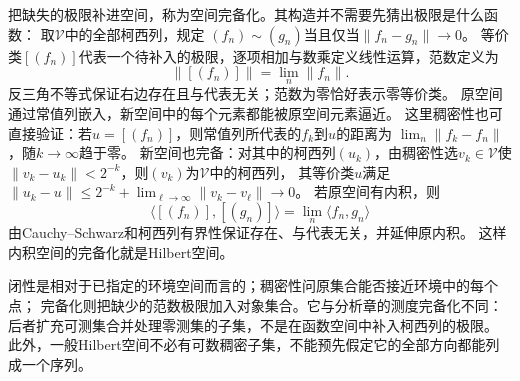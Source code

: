 把缺失的极限补进空间，称为空间完备化。其构造并不需要先猜出极限是什么函数：
取$\mathcal V$中的全部柯西列，规定
$(f_n)\sim(g_n)$当且仅当$\lVert f_n-g_n\rVert\to0$。
等价类$[(f_n)]$代表一个待补入的极限，逐项相加与数乘定义线性运算，范数定义为
\[
 \bigl\lVert[(f_n)]\bigr\rVert=\lim_n\lVert f_n\rVert.
\]
反三角不等式保证右边存在且与代表无关；范数为零恰好表示零等价类。
原空间通过常值列嵌入，新空间中的每个元素都能被原空间元素逼近。
这里稠密性也可直接验证：若$u=[(f_n)]$，则常值列所代表的$f_k$到$u$的距离为
$\lim_n\lVert f_k-f_n\rVert$，随$k\to\infty$趋于零。
新空间也完备：对其中的柯西列$(u_k)$，由稠密性选$v_k\in\mathcal V$使
$\lVert v_k-u_k\rVert<2^{-k}$，则$(v_k)$为$\mathcal V$中的柯西列，
其等价类$u$满足
$\lVert u_k-u\rVert\leq2^{-k}+\lim_{\ell\to\infty}\lVert v_k-v_\ell\rVert\to0$。
若原空间有内积，则
\[
 \bigl\langle[(f_n)],[(g_n)]\bigr\rangle
 =\lim_n\langle f_n,g_n\rangle
\]
由Cauchy--Schwarz和柯西列有界性保证存在、与代表无关，并延伸原内积。
这样内积空间的完备化就是Hilbert空间。

闭性是相对于已指定的环境空间而言的；稠密性问原集合能否接近环境中的每个点；
完备化则把缺少的范数极限加入对象集合。它与分析章的测度完备化不同：
后者扩充可测集合并处理零测集的子集，不是在函数空间中补入柯西列的极限。
此外，一般Hilbert空间不必有可数稠密子集，不能预先假定它的全部方向都能列成一个序列。


